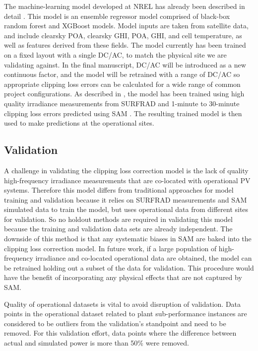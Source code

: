 \documentclass[conference]{IEEEtran}
\begin{document}
The machine-learning model developed at NREL has already been described in detail \cite{Anderson2020}. This model is an ensemble regressor model comprised of black-box random forest and XGBoost models. Model inputs are taken from satellite data, and include clearsky POA, clearsky GHI, POA, GHI, and cell temperature, as well as features derived from these fields. The model currently has been trained on a fixed layout with a single DC/AC, to match the physical site we are validating against. In the final manuscript, DC/AC will be introduced as a new continuous factor, and the model will be retrained with a range of DC/AC so appropriate clipping loss errors can be calculated for a wide range of common project configurations. As described in \cite{Anderson2020}, the model has been trained using high quality irradiance measurements from SURFRAD \cite{Augustine2000} and 1-minute to 30-minute clipping loss errors predicted using SAM \cite{Freeman2018}. The resulting trained model is then used to make predictions at the operational sites.


\subsection{Validation}
A challenge in validating the clipping loss correction model is the lack of quality high-frequency irradiance measurements that are co-located with operational PV systems. Therefore this model differs from traditional approaches for model training and validation because it relies on SURFRAD measurements and SAM simulated data to train the model, but uses operational data from different sites for validation. So no holdout methods are required in validating this model because the training and validation data sets are already independent. The downside of this method is that any systematic biases in SAM are baked into the clipping loss correction model. In future work, if a large population of high-frequency irradiance and co-located operational data are obtained, the model can be retrained holding out a subset of the data for validation. This procedure would have the benefit of incorporating any physical effects that are not captured by SAM.

Quality of operational datasets is vital to avoid disruption of validation. Data points in the operational dataset related to plant sub-performance instances are considered to be outliers from the validation's standpoint and need to be removed. For this validation effort, data points where the difference between actual and simulated power is more than 50\% were removed. 
\end{document}
